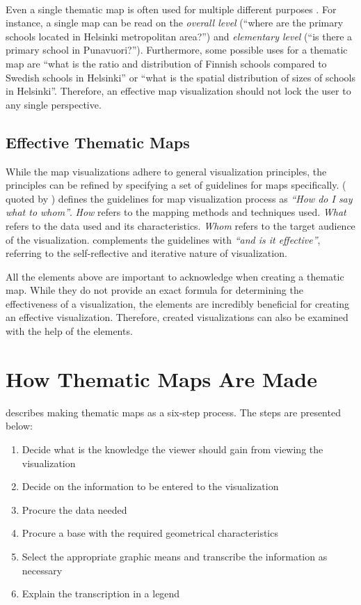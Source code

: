 ~

Even a single thematic map is often used for multiple different purposes \citep[chap.~2]{schlichtmann_visualization_2002}. For instance, a single map can be read on the \emph{overall level} (``where are the primary schools located in Helsinki metropolitan area?'') and \emph{elementary level} (``is there a primary school in Punavuori?''). Furthermore, some possible uses for a thematic map are ``what is the ratio and distribution of Finnish schools compared to Swedish schools in Helsinki'' or ``what is the spatial distribution of sizes of schools in Helsinki''. Therefore, an effective map visualization should not lock the user to any single perspective.

\subsection{Effective Thematic Maps}
\label{subsection:effectivemaps}

While the map visualizations adhere to general visualization principles, the principles can be refined by specifying a set of guidelines for maps specifically. \citeauthor{koeman_het_1969} (\citeyear{koeman_het_1969} quoted by \citealt[p.~12]{kraak_cartographic_1998}) defines the guidelines for map visualization process as \emph{``How do I say what to whom''}. \emph{How} refers to the mapping methods and techniques used. \emph{What} refers to the data used and its characteristics. \emph{Whom} refers to the target audience of the visualization. \citet{kraak_cartographic_1998} complements the guidelines with \emph{``and is it effective''}, referring to the self-reflective and iterative nature of visualization.

All the elements above are important to acknowledge when creating a thematic map. While they do not provide an exact formula for determining the effectiveness of a visualization, the elements are incredibly beneficial for creating an effective visualization. Therefore, created visualizations can also be examined with the help of the elements.

\section{How Thematic Maps Are Made}
\label{section:thematicmaps}
\citet{schlichtmann_visualization_2002} describes making thematic maps as a six-step process. The steps are presented below:
\begin{enumerate}
	\item Decide what is the knowledge the viewer should gain from viewing the visualization
	\item Decide on the information to be entered to the visualization
	\item Procure the data needed
	\item Procure a base with the required geometrical characteristics
	\item Select the appropriate graphic means and transcribe the information as necessary
	\item Explain the transcription in a legend
\end{enumerate}

